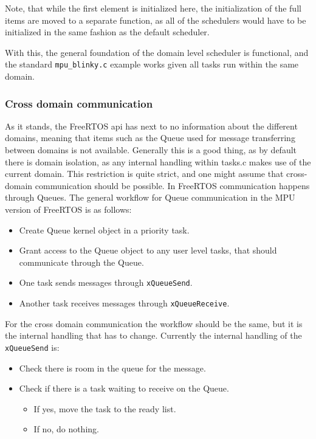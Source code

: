 Note, that while the first element is initialized here, the initialization of
the full items are moved to a separate function, as all of the schedulers would
have to be initialized in the same fashion as the default scheduler.

With this, the general foundation of the domain level scheduler is functional,
and the standard \texttt{mpu\_blinky.c} example works given all tasks run
within the same domain.

\subsubsection{Cross domain communication}
As it stands, the FreeRTOS api has next to no information about the different
domains, meaning that items such as the Queue used for message transferring
between domains is not available. Generally this is a good thing, as by default
there is domain isolation, as any internal handling within tasks.c makes use of
the current domain. This restriction is quite strict, and one might assume that
cross-domain communication should be possible. In FreeRTOS communication
happens through Queues. The general workflow for Queue communication in the MPU
version of FreeRTOS is as follows:

\begin{itemize}
  \item Create Queue kernel object in a priority task.
  \item Grant access to the Queue object to any user level tasks, that should communicate through the Queue.
  \item One task sends messages through \texttt{xQueueSend}.
  \item Another task receives messages through \texttt{xQueueReceive}.
\end{itemize}

For the cross domain communication the workflow should be the same, but it is
the internal handling that has to change. Currently the internal handling of
the \texttt{xQueueSend} is:
\begin{itemize}
  \item Check there is room in the queue for the message.
  \item Check if there is a task waiting to receive on the Queue.
    \begin{itemize}
      \item If yes, move the task to the ready list.
      \item If no, do nothing.
    \end{itemize}
\end{itemize}

